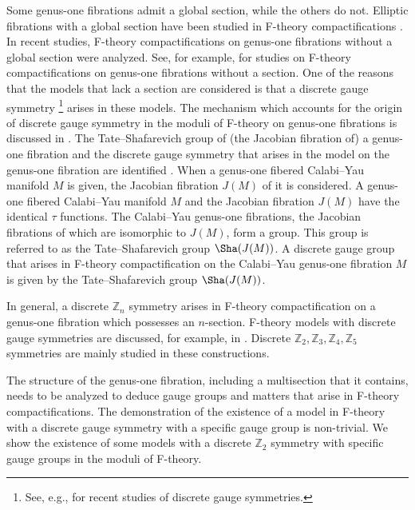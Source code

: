 \documentclass[12pt]{article}
\def\Z{\mathbb{Z}}
\begin{document}
\par Some genus-one fibrations admit a global section, while the others do not. Elliptic fibrations with a global section have been studied in F-theory compactifications \cite{MorrisonPark, MPW, BGK, BMPWsection, CKP, AL, LSW, KSW2015, MP2, BMW2017, KimuraMizoguchi, Kimura1802, LRW2018}. In recent studies, F-theory compactifications on genus-one fibrations without a global section were analyzed. See, for example, \cite{BM, MTsection, AGGK, KMOPR, GGK, MPTW, MPTW2, CDKPP, LMTW, K, K2, KCY4, Kdisc, Kimura1801} for studies on F-theory compactifications on genus-one fibrations without a section. One of the reasons that the models that lack a section are considered is that a discrete gauge symmetry \footnote{See, e.g., \cite{KNPRR, ACKO, BS, HSsums, CIM, BCMRU, BCMU, HS, NRRV2013, BRU, KKLM, BGKintfiber, HS2, GPR, CGP} for recent studies of discrete gauge symmetries.} arises in these models. The mechanism which accounts for the origin of discrete gauge symmetry in the moduli of F-theory on genus-one fibrations is discussed in \cite{MTsection}. The Tate--Shafarevich group of (the Jacobian fibration of) a genus-one fibration and the discrete gauge symmetry that arises in the model on the genus-one fibration are identified \cite{BDHKMMS}. When a genus-one fibered Calabi--Yau manifold $M$ is given, the Jacobian fibration $J(M)$ of it is considered. A genus-one fibered Calabi--Yau manifold $M$ and the Jacobian fibration $J(M)$ have the identical $\tau$ functions. The Calabi--Yau genus-one fibrations, the Jacobian fibrations of which are isomorphic to $J(M)$, form a group. This group is referred to as the Tate--Shafarevich group $\Sha(J(M))$. A discrete gauge group that arises in F-theory compactification on the Calabi--Yau genus-one fibration $M$ is given by the Tate--Shafarevich group $\Sha(J(M))$. 
\par In general, a discrete $\Z_n$ symmetry arises in F-theory compactification on a genus-one fibration which possesses an $n$-section. F-theory models with discrete gauge symmetries are discussed, for example, in \cite{MTsection, KMOPR, GGK, MPTW, MPTW2, BGKintfiber, CDKPP, LMTW, Kdisc, Kimura1801}. Discrete $\Z_2,\Z_3,\Z_4,\Z_5$ symmetries are mainly studied in these constructions. 
\par The structure of the genus-one fibration, including a multisection that it contains, needs to be analyzed to deduce gauge groups and matters that arise in F-theory compactifications. The demonstration of the existence of a model in F-theory with a discrete gauge symmetry with a specific gauge group is non-trivial. We show the existence of some models with a discrete $\Z_2$ symmetry with specific gauge groups in the moduli of F-theory.
\end{document}
